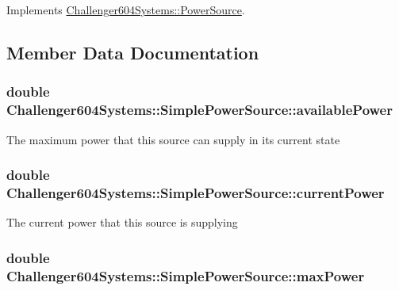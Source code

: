 Implements \hyperlink{class_challenger604_systems_1_1_power_source_acaed7f7cc4d536770a9e51173eed1d75}{Challenger604\-Systems\-::\-Power\-Source}.



\subsection{Member Data Documentation}
\hypertarget{class_challenger604_systems_1_1_simple_power_source_a8cbfee6545d9538d4850d9aad02cba9a}{
\subsubsection[{available\-Power}]{\setlength{\rightskip}{0pt plus 5cm}double Challenger604\-Systems\-::\-Simple\-Power\-Source\-::available\-Power\hspace{0.3cm}{\ttfamily [protected]}}}\label{class_challenger604_systems_1_1_simple_power_source_a8cbfee6545d9538d4850d9aad02cba9a}
The maximum power that this source can supply in its current state \hypertarget{class_challenger604_systems_1_1_simple_power_source_a26492b1913645d864d7cc8ace1e1a2f8}{
\subsubsection[{current\-Power}]{\setlength{\rightskip}{0pt plus 5cm}double Challenger604\-Systems\-::\-Simple\-Power\-Source\-::current\-Power\hspace{0.3cm}{\ttfamily [protected]}}}\label{class_challenger604_systems_1_1_simple_power_source_a26492b1913645d864d7cc8ace1e1a2f8}
The current power that this source is supplying \hypertarget{class_challenger604_systems_1_1_simple_power_source_a53ec33df745b2dc2c9963a0510eaccf0}{
\subsubsection[{max\-Power}]{\setlength{\rightskip}{0pt plus 5cm}double Challenger604\-Systems\-::\-Simple\-Power\-Source\-::max\-Power\hspace{0.3cm}{\ttfamily [protected]}}}\label{class_challenger604_systems_1_1_simple_power_source_a53ec33df745b2dc2c9963a0510eaccf0}
